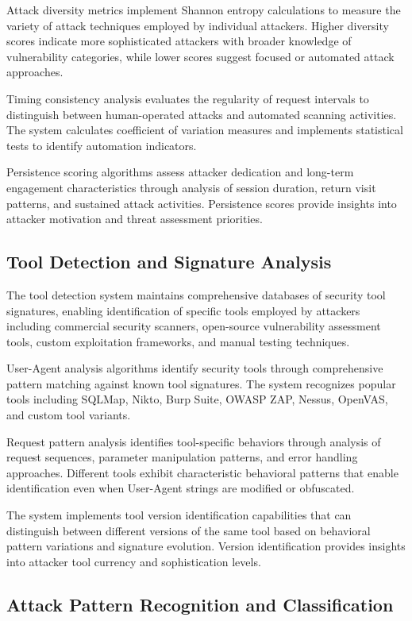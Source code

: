 Attack diversity metrics implement Shannon entropy calculations to measure the variety of attack techniques employed by individual attackers. Higher diversity scores indicate more sophisticated attackers with broader knowledge of vulnerability categories, while lower scores suggest focused or automated attack approaches.

Timing consistency analysis evaluates the regularity of request intervals to distinguish between human-operated attacks and automated scanning activities. The system calculates coefficient of variation measures and implements statistical tests to identify automation indicators.

Persistence scoring algorithms assess attacker dedication and long-term engagement characteristics through analysis of session duration, return visit patterns, and sustained attack activities. Persistence scores provide insights into attacker motivation and threat assessment priorities.

\subsection{Tool Detection and Signature Analysis}

The tool detection system maintains comprehensive databases of security tool signatures, enabling identification of specific tools employed by attackers including commercial security scanners, open-source vulnerability assessment tools, custom exploitation frameworks, and manual testing techniques.

User-Agent analysis algorithms identify security tools through comprehensive pattern matching against known tool signatures. The system recognizes popular tools including SQLMap, Nikto, Burp Suite, OWASP ZAP, Nessus, OpenVAS, and custom tool variants.

Request pattern analysis identifies tool-specific behaviors through analysis of request sequences, parameter manipulation patterns, and error handling approaches. Different tools exhibit characteristic behavioral patterns that enable identification even when User-Agent strings are modified or obfuscated.

The system implements tool version identification capabilities that can distinguish between different versions of the same tool based on behavioral pattern variations and signature evolution. Version identification provides insights into attacker tool currency and sophistication levels.

\subsection{Attack Pattern Recognition and Classification}

